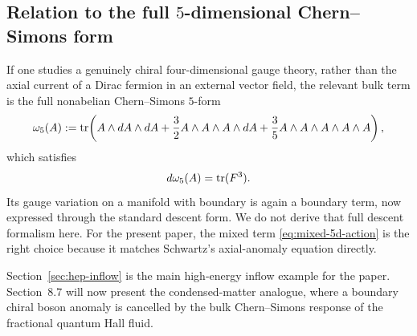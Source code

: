 \subsection{Relation to the full \texorpdfstring{$5$}{5}-dimensional Chern--Simons form}

\begin{remark}\label{rem:full-cs5-story}
If one studies a genuinely chiral four-dimensional gauge theory, rather than the axial current of a Dirac fermion in an external vector field, the relevant bulk term is the full nonabelian Chern--Simons $5$-form
\begin{equation}\label{eq:cs5-full}
\omega_5(A)
:=
\operatorname{tr}\!\left(
A\wedge dA\wedge dA
+\frac{3}{2}A\wedge A\wedge A\wedge dA
+\frac{3}{5}A\wedge A\wedge A\wedge A\wedge A
\right),
\end{equation}
which satisfies
\begin{equation*}
d\omega_5(A)=\operatorname{tr}(F^3).
\end{equation*}
Its gauge variation on a manifold with boundary is again a boundary term, now expressed through the standard descent form. We do not derive that full descent formalism here. For the present paper, the mixed term \eqref{eq:mixed-5d-action} is the right choice because it matches Schwartz's axial-anomaly equation directly.
\end{remark}

\begin{remark}\label{rem:hep-to-cm-forward}
Section~\ref{sec:hep-inflow} is the main high-energy inflow example for the paper. Section~8.7 will now present the condensed-matter analogue, where a boundary chiral boson anomaly is cancelled by the bulk Chern--Simons response of the fractional quantum Hall fluid.
\end{remark}
